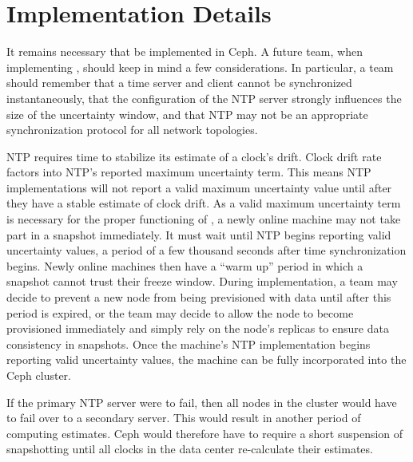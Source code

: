 \chapter{Implementation Details}
\label{sec:impl}

It remains necessary that \alg be implemented in Ceph. 
A future team, when implementing \alg, should keep in 
mind a few considerations. In particular, a team should 
remember that a time server and client cannot be 
synchronized instantaneously, that the configuration 
of the NTP server strongly influences the size of the 
uncertainty window, and that NTP may not be an 
appropriate synchronization protocol for all network topologies. 

NTP requires time to stabilize its estimate of a clock's drift.
Clock drift rate factors into NTP's reported maximum uncertainty
term. This means NTP implementations will not report a 
valid maximum uncertainty value
until after they have a stable estimate of clock drift.
As a valid maximum uncertainty term is necessary for the proper 
functioning of \alg, a newly online machine may not take part in
a snapshot immediately. It must wait until NTP begins reporting 
valid uncertainty values, a period of a few thousand seconds after 
time synchronization begins. Newly online machines then have a
``warm up'' period in which a snapshot cannot trust their freeze
window. During implementation, a team may decide to prevent 
a new node from being previsioned with data until after this period 
is expired, or the team may decide to allow the node to 
become provisioned immediately and simply rely on the node's 
replicas to ensure data consistency in snapshots. Once 
the machine's NTP implementation begins reporting
valid uncertainty values, the machine can be fully
incorporated into the Ceph cluster.

If the primary NTP server were to fail, then all nodes in the
cluster would have to fail over to a secondary server.
This would result in another period of computing estimates. 
Ceph would therefore
have to require a short suspension of snapshotting until all clocks in
the data center re-calculate their estimates.

